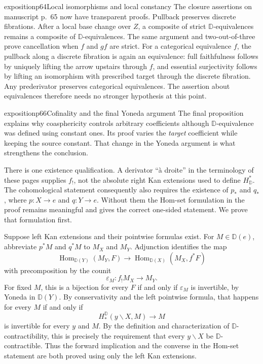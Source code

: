 \begin{dcomment}{exposition}{p64}{Local isomorphisms and local constancy}
The closure assertions on manuscript p.~65 now have transparent proofs. Pullback preserves discrete fibrations. After a local base change over $Z$, a composite of strict $\mathbb D$-equivalences remains a composite of $\mathbb D$-equivalences. The same argument and two-out-of-three prove cancellation when $f$ and $gf$ are strict. For a categorical equivalence $f$, the pullback along a discrete fibration is again an equivalence: full faithfulness follows by uniquely lifting the arrow upstairs through $f$, and essential surjectivity follows by lifting an isomorphism with prescribed target through the discrete fibration. Any prederivator preserves categorical equivalences. The assertion about equivalences therefore needs no stronger hypothesis at this point.
\end{dcomment}

\begin{dcomment}{exposition}{p66}{Cofinality and the final Yoneda argument}
The final proposition explains why coasphericity controls arbitrary coefficients although $\mathbb D$-equivalence was defined using constant ones. Its proof varies the \emph{target} coefficient while keeping the source constant. That change in the Yoneda argument is what strengthens the conclusion.

There is one existence qualification. A derivator ``\`a droite'' in the terminology of these pages supplies $f_!$, not the absolute right Kan extensions used to define $H^*_{\mathbb D}$. The cohomological statement consequently also requires the existence of $p_*$ and $q_*$, where $p:X\to e$ and $q:Y\to e$. Without them the Hom-set formulation in the proof remains meaningful and gives the correct one-sided statement. We prove that formulation first.

Suppose left Kan extensions and their pointwise formulas exist. For $M\in\mathbb D(e)$, abbreviate $p^*M$ and $q^*M$ to $M_X$ and $M_Y$. Adjunction identifies the map
\[
 \operatorname{Hom}_{\mathbb D(Y)}(M_Y,F)
 \longrightarrow
 \operatorname{Hom}_{\mathbb D(X)}(M_X,f^*F)
\]
with precomposition by the counit
\[
 \varepsilon_M:f_!M_X\longrightarrow M_Y.
\]
For fixed $M$, this is a bijection for every $F$ if and only if $\varepsilon_M$ is invertible, by Yoneda in $\mathbb D(Y)$. By conservativity and the left pointwise formula, that happens for every $M$ if and only if
\[
 H_*^{\mathbb D}(y\backslash X,M)\longrightarrow M
\]
is invertible for every $y$ and $M$. By the definition and characterization of $\mathbb D$-contractibility, this is precisely the requirement that every $y\backslash X$ be $\mathbb D$-contractible. Thus the forward implication and the converse in the Hom-set statement are both proved using only the left Kan extensions.


\end{dcomment}
